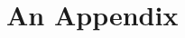 \documentclass[a4paper, 11pt, oneside]{thesis/HSR}  %
\begin{document}

\appendix %




\chapter{An Appendix}
\Blindtext

\backmatter

\onecolumn

\label{Bibliography}
\end{document}

